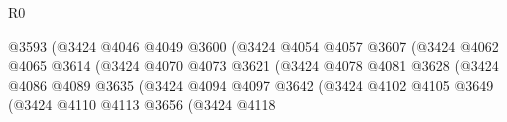 \begin{lexlean}{R0}
\begin{coremodule}
                                                    @3593
                                                    (@3424
                                                      @4046
                                                      @4049
                                                      @3600
                                                      (@3424
                                                        @4054
                                                        @4057
                                                        @3607
                                                        (@3424
                                                          @4062
                                                          @4065
                                                          @3614
                                                          (@3424
                                                            @4070
                                                            @4073
                                                            @3621
                                                            (@3424
                                                              @4078
                                                              @4081
                                                              @3628
                                                              (@3424
                                                                @4086
                                                                @4089
                                                                @3635
                                                                (@3424
                                                                  @4094
                                                                  @4097
                                                                  @3642
                                                                  (@3424
                                                                    @4102
                                                                    @4105
                                                                    @3649
                                                                    (@3424
                                                                      @4110
                                                                      @4113
                                                                      @3656
                                                                      (@3424
                                                                        @4118

\end{coremodule}
\end{lexlean}
